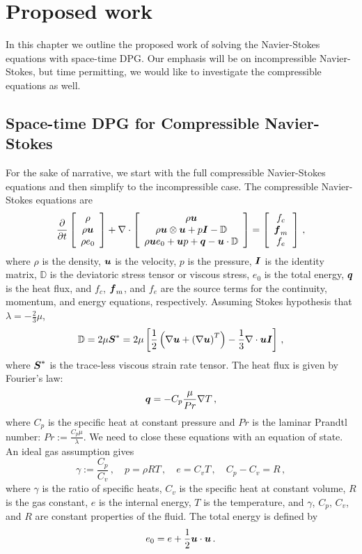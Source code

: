 \documentclass[Proposal.tex]{subfiles}
\begin{document}
\chapter{Proposed work}
In this chapter we outline the proposed work of solving the Navier-Stokes equations with space-time DPG. 
Our emphasis will be on incompressible Navier-Stokes, but time permitting, we would like to investigate the compressible equations as well.


\section{Space-time DPG for Compressible Navier-Stokes}
For the sake of narrative, we start with the full compressible Navier-Stokes equations and then simplify to the incompressible case.
The compressible Navier-Stokes equations are
\begin{align}
\frac{\partial}{\partial t}\left[ \begin{array}{c} \rho\\ \rho\boldsymbol u\\ \rho e_0\\ \end{array} \right]
+\nabla\cdot\left[ \begin{array}{c} \rho\boldsymbol u\\ \rho\boldsymbol u\otimes\boldsymbol u+p\boldsymbol I-\mathbb{D}\\ \rho\boldsymbol u e_0+\boldsymbol u p+\boldsymbol q-\boldsymbol u\cdot\mathbb{D}\\ \end{array} \right]
=\left[ \begin{array}{c} f_c\\ \boldsymbol f_m\\ f_e\\ \end{array} \right]\,,
\end{align}
where $\rho$ is the density, $\boldsymbol u$ is the velocity, $p$ is the pressure, $\boldsymbol I$ is the identity matrix,
$\mathbb{D}$ is the deviatoric stress tensor or viscous stress, $e_0$ is the total energy, $\boldsymbol q$ is the heat flux, 
and $f_c$, $\boldsymbol f_m$, and $f_e$ are the source terms for the continuity, momentum, and energy equations, respectively.
Assuming Stokes hypothesis that $\lambda=-\frac{2}{3}\mu$, 
\begin{equation*}
	\mathbb{D}=2\mu\boldsymbol S^*=2\mu\left[ \frac{1}{2}\left( \nabla\boldsymbol u+\left( \nabla\boldsymbol u \right)^T \right)-\frac{1}{3}\nabla\cdot\boldsymbol u\boldsymbol I \right]\,,
\end{equation*}
where $\boldsymbol S^*$ is the trace-less viscous strain rate tensor.
The heat flux is given by Fourier's law:
\begin{equation*}
	\boldsymbol q=-C_p\frac{\mu}{Pr}\nabla T\,,
\end{equation*}
where $C_p$ is the specific heat at constant pressure and $Pr$ is the laminar Prandtl number: $Pr:=\frac{C_p\mu}{\lambda}$.
We need to close these equations with an equation of state. An ideal gas assumption gives
\begin{equation*}
	\gamma:=\frac{C_p}{C_v}\,,\quad p=\rho RT\,,\quad e=C_v T\,,\quad C_p-C_v=R\,,
\end{equation*}
where $\gamma$ is the ratio of specific heats, $C_v$ is the specific heat at constant volume, $R$ is the gas constant,
$e$ is the internal energy, $T$ is the temperature,
and $\gamma$, $C_p$, $C_v$, and $R$ are constant properties of the fluid.
The total energy is defined by
\begin{equation*}
	e_0=e+\frac{1}{2}\boldsymbol u\cdot\boldsymbol u\,.
\end{equation*}
\end{document}
